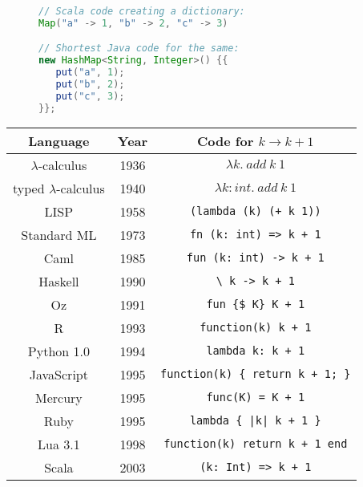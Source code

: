 \begin{wrapfigure}{l}{0.38\columnwidth}%
\vspace{-0.7\baselineskip}
\begin{lstlisting}[language=Java]
// Scala code creating a dictionary:
Map("a" -> 1, "b" -> 2, "c" -> 3)

// Shortest Java code for the same:
new HashMap<String, Integer>() {{
   put("a", 1);
   put("b", 2);
   put("c", 3);
}};
\end{lstlisting}

\vspace{0\baselineskip}
\end{wrapfigure}%
\begin{wraptable}{r}{0.6\columnwidth}%
\begin{centering}
\vspace{-8\baselineskip}
\begin{tabular}{|c|c|c|}
\hline 
\textbf{\small{}Language} & \textbf{\small{}Year} & \textbf{\small{}Code for }{\small{}$k\rightarrow k+1$}\tabularnewline
\hline 
\hline 
{\footnotesize{}$\lambda$-calculus} & {\footnotesize{}1936} & $\lambda k.~add~k~1$\tabularnewline
\hline 
{\footnotesize{}typed $\lambda$-calculus} & {\footnotesize{}1940} & $\lambda k:int.~add~k~1$\tabularnewline
\hline 
{\footnotesize{}LISP} & {\footnotesize{}1958} & \texttt{\footnotesize{}}\lstinline!(lambda (k) (+ k 1))!\tabularnewline
\hline 
{\footnotesize{}Standard ML} & {\footnotesize{}1973} & \texttt{\footnotesize{}}\lstinline!fn (k: int) => k + 1!\tabularnewline
\hline 
{\footnotesize{}Caml} & {\footnotesize{}1985} & \lstinline!fun (k: int) -> k + 1!\tabularnewline
\hline 
{\footnotesize{}Haskell} & {\footnotesize{}1990} & \lstinline!\ k -> k + 1!\tabularnewline
\hline 
{\footnotesize{}Oz} & {\footnotesize{}1991} & \lstinline!fun {$ K} K + 1!\tabularnewline
\hline 
{\footnotesize{}R} & {\footnotesize{}1993} & \lstinline!function(k) k + 1!\tabularnewline
\hline 
{\footnotesize{}Python 1.0} & {\footnotesize{}1994} & \lstinline!lambda k: k + 1!\tabularnewline
\hline 
{\footnotesize{}JavaScript} & {\footnotesize{}1995} & \lstinline!function(k) { return k + 1; }!\tabularnewline
\hline 
{\footnotesize{}Mercury} & {\footnotesize{}1995} & \lstinline!func(K) = K + 1!\tabularnewline
\hline 
{\footnotesize{}Ruby} & {\footnotesize{}1995} & \lstinline!lambda { |k| k + 1 }!\tabularnewline
\hline 
{\footnotesize{}Lua 3.1} & {\footnotesize{}1998} & \lstinline!function(k) return k + 1 end!\tabularnewline
\hline 
{\footnotesize{}Scala} & {\footnotesize{}2003} & \lstinline!(k: Int) => k + 1!\tabularnewline

\end{tabular}
\end{centering}
\end{wraptable}
